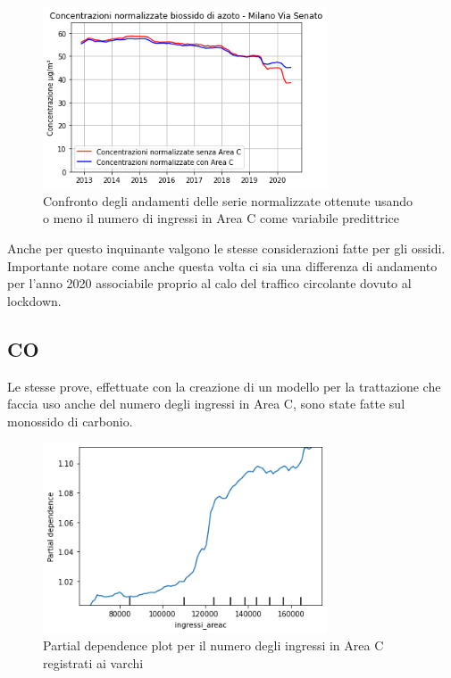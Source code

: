 \documentclass[a4paper,12pt]{report}
\begin{document}
\begin{figure}[h]
\centering
\includegraphics[width=0.75\textwidth]{no2_areac}
\caption{Confronto degli andamenti delle serie normalizzate ottenute usando o meno il numero di ingressi in Area C come variabile predittrice}
\label{fig:no2_areac}
\end{figure}

Anche per questo inquinante valgono le stesse considerazioni fatte per gli ossidi. Importante notare come anche questa volta ci sia una differenza di andamento per l'anno 2020 associabile proprio al calo del traffico circolante dovuto al lockdown.

\subsection{CO}
Le stesse prove, effettuate con la creazione di un modello per la trattazione che faccia uso anche del numero degli ingressi in Area C, sono state fatte sul monossido di carbonio.

\begin{figure}[h]
\centering
\includegraphics[width=0.75\textwidth]{co_part_dep}
\caption{Partial dependence plot per il numero degli ingressi in Area C registrati ai varchi}
\label{fig:co_part_dep}
\end{figure}
\end{document}
